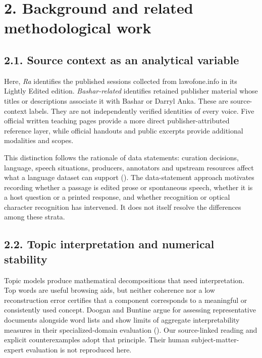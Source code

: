 \documentclass[
  11pt,
]{article}
\begin{document}
\FloatBarrier

\section{2. Background and related methodological
work}\label{background-and-related-methodological-work}

\FloatBarrier

\subsection{2.1. Source context as an analytical
variable}\label{source-context-as-an-analytical-variable}

Here, \emph{Ra} identifies the published sessions collected from
lawofone.info in its Lightly Edited edition. \emph{Bashar-related}
identifies retained publisher material whose titles or descriptions
associate it with Bashar or Darryl Anka. These are source-context
labels. They are not independently verified identities of every voice.
Five official written teaching pages provide a more direct
publisher-attributed reference layer, while official handouts and public
excerpts provide additional modalities and scopes.

This distinction follows the rationale of data statements: curation
decisions, language, speech situations, producers, annotators and
upstream resources affect what a language dataset can support
(). The
data-statement approach motivates recording whether a passage is edited
prose or spontaneous speech, whether it is a host question or a printed
response, and whether recognition or optical character recognition has
intervened. It does not itself resolve the differences among these
strata.

\FloatBarrier

\subsection{2.2. Topic interpretation and numerical
stability}\label{topic-interpretation-and-numerical-stability}

Topic models produce mathematical decompositions that need
interpretation. Top words are useful browsing aids, but neither
coherence nor a low reconstruction error certifies that a component
corresponds to a meaningful or consistently used concept. Doogan and
Buntine argue for assessing representative documents alongside word
lists and show limits of aggregate interpretability measures in their
specialized-domain evaluation (). Our source-linked reading and explicit counterexamples
adopt that principle. Their human subject-matter-expert evaluation is
not reproduced here.
\end{document}
